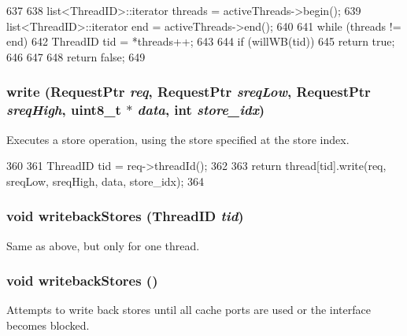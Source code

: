 \begin{DoxyCode}
637 {
638     list<ThreadID>::iterator threads = activeThreads->begin();
639     list<ThreadID>::iterator end = activeThreads->end();
640 
641     while (threads != end) {
642         ThreadID tid = *threads++;
643 
644         if (willWB(tid))
645             return true;
646     }
647 
648     return false;
649 }
\end{DoxyCode}
\hypertarget{classLSQ_a1be8f3ccb9b2787a2c92bfab3fda9675}{
\subsubsection[{write}]{ write ({\bf RequestPtr} {\em req}, \/  {\bf RequestPtr} {\em sreqLow}, \/  {\bf RequestPtr} {\em sreqHigh}, \/  uint8\_\-t $\ast$ {\em data}, \/  int {\em store\_\-idx})}}
\label{classLSQ_a1be8f3ccb9b2787a2c92bfab3fda9675}
Executes a store operation, using the store specified at the store index. 


\begin{DoxyCode}
360 {
361     ThreadID tid = req->threadId();
362 
363     return thread[tid].write(req, sreqLow, sreqHigh, data, store_idx);
364 }
\end{DoxyCode}
\hypertarget{classLSQ_aebf9f82a83e61cd390df68a2fb7a8641}{
\subsubsection[{writebackStores}]{\setlength{\rightskip}{0pt plus 5cm}void writebackStores ({\bf ThreadID} {\em tid})}}
\label{classLSQ_aebf9f82a83e61cd390df68a2fb7a8641}
Same as above, but only for one thread. \hypertarget{classLSQ_a5f04e29d6f6feb8b86460491f2ba7547}{
\subsubsection[{writebackStores}]{\setlength{\rightskip}{0pt plus 5cm}void writebackStores ()}}
\label{classLSQ_a5f04e29d6f6feb8b86460491f2ba7547}
Attempts to write back stores until all cache ports are used or the interface becomes blocked. 


